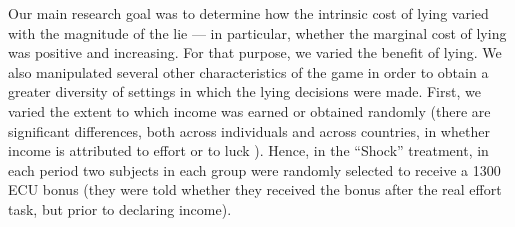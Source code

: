 \documentclass[12pt]{article}
\begin{document}





\par Our main research goal was to determine how the intrinsic cost of lying varied with the magnitude of the lie --- in particular, whether the marginal cost of lying was positive and increasing.  For that purpose, we varied the benefit of lying. We also manipulated several other characteristics of the game in order to obtain a greater diversity of settings in which the lying decisions were made. First, we varied the extent to which income was earned or obtained randomly (there are significant differences, both across individuals and across countries, in whether income is attributed to effort or to luck \citep{alesina2005fairness}). Hence, in the ``Shock'' treatment, in each period two subjects in each group were randomly selected to receive a 1300 ECU bonus (they were told whether they received the bonus after the real effort task, but prior to declaring income).\footnotemark{}
\end{document}
